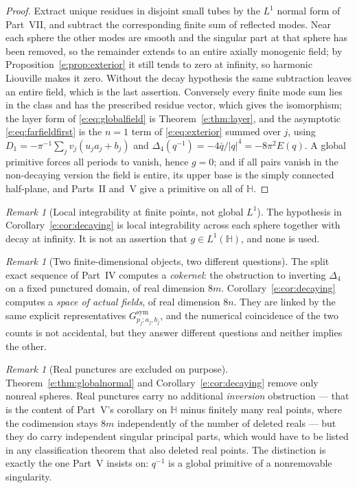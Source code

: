 \documentclass[11pt,a4paper]{article}
\numberwithin{equation}{section}
\theoremstyle{definition}
\theoremstyle{remark}
\newtheorem{remark}[theorem]{Remark}
\theoremstyle{plain}
\newcommand{\HH}{\mathbb H}
\newcommand{\lap}{\Delta_4}
\newcommand{\abs}[1]{\lvert #1\rvert}
\begin{document}
\begin{proof}
Extract unique residues in disjoint small tubes by the $L^1$ normal form
of Part~VII, and subtract the corresponding finite sum of reflected
modes. Near each sphere the other modes are smooth and the singular part
at that sphere has been removed, so the remainder extends to an entire
axially monogenic field; by Proposition~\ref{e:prop:exterior} it still
tends to zero at infinity, so harmonic Liouville makes it zero. Without
the decay hypothesis the same subtraction leaves an entire field, which
is the last assertion. Conversely every finite mode sum lies in the class
and has the prescribed residue vector, which gives the isomorphism; the
layer form of \eqref{e:eq:globalfield} is Theorem~\ref{e:thm:layer}, and
the asymptotic \eqref{e:eq:farfieldfirst} is the $n=1$ term of
\eqref{e:eq:exterior} summed over $j$, using
$D_1=-\pi^{-1}\sum_jv_j(u_ja_j+b_j)$ and
$\lap(q^{-1})=-4\bar q/\abs q^4=-8\pi^2E(q)$. A global primitive forces
all periods to vanish, hence $g=0$; and if all pairs vanish in the
non-decaying version the field is entire, its upper base is the simply
connected half-plane, and Parts~II and~V give a primitive on all of
$\HH$.
\end{proof}

\begin{remark}[Local integrability at finite points, not global $L^1$]
The hypothesis in Corollary~\ref{e:cor:decaying} is local integrability
across each sphere together with decay at infinity. It is not an
assertion that $g\in L^1(\HH)$, and none is used.
\end{remark}

\begin{remark}[Two finite-dimensional objects, two different questions]
\label{e:rem:twoobjects}
The split exact sequence of Part~IV computes a \emph{cokernel}: the
obstruction to inverting $\lap$ on a fixed punctured domain, of real
dimension $8m$. Corollary~\ref{e:cor:decaying} computes a \emph{space of
actual fields}, of real dimension $8n$. They are linked by the same
explicit representatives $G^{\mathrm{sym}}_{p_j;a_j,b_j}$, and the
numerical coincidence of the two counts is not accidental, but they
answer different questions and neither implies the other.
\end{remark}

\begin{remark}[Real punctures are excluded on purpose]
\label{e:rem:realpunctures}
Theorem~\ref{e:thm:globalnormal} and Corollary~\ref{e:cor:decaying}
remove only nonreal spheres. Real punctures carry no additional
\emph{inversion} obstruction --- that is the content of Part~V's
corollary on $\HH$ minus finitely many real points, where the codimension
stays $8m$ independently of the number of deleted reals --- but they do
carry independent singular principal parts, which would have to be
listed in any classification theorem that also deleted real points. The
distinction is exactly the one Part~V insists on: $q^{-1}$ is a global
primitive of a nonremovable singularity.
\end{remark}
\end{document}
